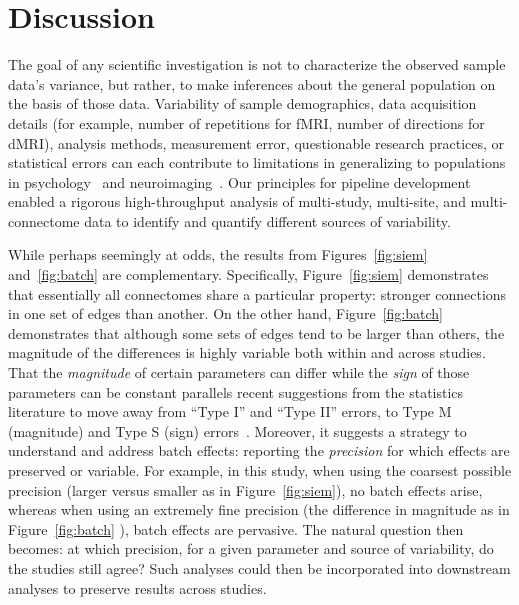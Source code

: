 \documentclass[11pt]{article}
\begin{document}
\section{Discussion}


The goal of any scientific investigation is not to characterize the observed sample data’s variance, but rather, to make inferences about the general population on the basis of those data.  
Variability of sample demographics, data acquisition details (for example, number of repetitions for fMRI, number of directions for dMRI), analysis methods, measurement error, questionable research practices, or statistical errors can each contribute to limitations in generalizing to populations in psychology~\cite{Button2013} and neuroimaging~\cite{Costafreda2009}.
Our principles for pipeline development enabled a rigorous high-throughput analysis of multi-study, multi-site, and multi-connectome data to identify and quantify different sources of variability.

While perhaps seemingly at odds, the results from Figures~\ref{fig:siem} and~\ref{fig:batch} are complementary.  Specifically, Figure~\ref{fig:siem} demonstrates that essentially all connectomes share a particular property: stronger connections in one set of edges than another. On the other hand, Figure~\ref{fig:batch} demonstrates that although some sets of edges tend to be larger than others, the {magnitude} of the differences is highly variable both within and across studies. That the \emph{magnitude} of certain parameters can differ while the \emph{sign} of those parameters can be constant parallels recent suggestions from the statistics literature to move away from ``Type I'' and ``Type II'' errors, to Type M (magnitude) and Type  S (sign) errors~\cite{gelman14a}. Moreover, it suggests a strategy to understand and address batch effects: reporting the \emph{precision} for which effects are preserved or variable.  For example, in this study, when using the coarsest possible precision (larger versus smaller as in Figure~\ref{fig:siem}), no batch effects arise, whereas when using an extremely fine precision (the difference in magnitude as in Figure~\ref{fig:batch} ), batch effects are pervasive. The natural question then becomes: at which precision, for a given parameter and source of variability, do the studies still agree? Such analyses could then be incorporated into downstream analyses to preserve results across studies. 
\end{document}
